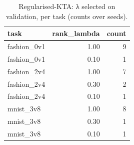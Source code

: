 \begin{table}
\caption{Regularised-KTA: λ selected on validation, per task (counts over seeds).}
\label{tab:table3_reg_lambda_selected}
\begin{tabular}{lrr}
\toprule
task & rank\_lambda & count \\
\midrule
fashion\_0v1 & 1.00 & 9 \\
fashion\_0v1 & 0.10 & 1 \\
fashion\_2v4 & 1.00 & 7 \\
fashion\_2v4 & 0.30 & 2 \\
fashion\_2v4 & 0.10 & 1 \\
mnist\_3v8 & 1.00 & 8 \\
mnist\_3v8 & 0.30 & 1 \\
mnist\_3v8 & 0.10 & 1 \\
\bottomrule
\end{tabular}
\end{table}
